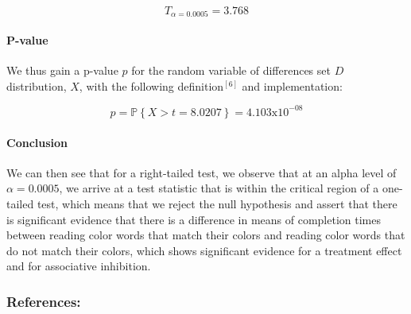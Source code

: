 \documentclass[11pt]{article}
\begin{document}
\[T_{\alpha = 0.0005} = 3.768\]

\hypertarget{p-value}{%
\paragraph{P-value}\label{p-value}}

We thus gain a p-value \(p\) for the random variable of differences set
\(D\) distribution, \(X\), with the following definition\(^{[6]}\) and
implementation:

\[p = \mathbb{P}\left\{X > t = 8.0207\right \} = 4.103\text{x}10^{-08}\]

\hypertarget{conclusion}{%
\paragraph{Conclusion}\label{conclusion}}

We can then see that for a right-tailed test, we observe that at an
alpha level of \(\alpha = 0.0005\), we arrive at a test statistic that
is within the critical region of a one-tailed test, which means that we
reject the null hypothesis and assert that there is significant evidence
that there is a difference in means of completion times between reading
color words that match their colors and reading color words that do not
match their colors, which shows significant evidence for a treatment
effect and for associative inhibition.

    \hypertarget{references}{%
\subsubsection{References:}\label{references}}
\end{document}
